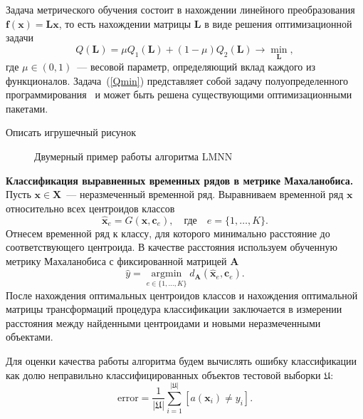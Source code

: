Задача метрического обучения состоит в нахождении линейного преобразования $\mathbf{f}(\mathbf{x}) = \mathbf{Lx}$, то есть нахождении матрицы $\mathbf{L}$ в виде решения оптимизационной задачи
\begin{equation}
\label{Qmin}
Q(\mathbf{L}) = \mu Q_1(\mathbf{L}) + (1 - \mu) Q_2(\mathbf{L}) \rightarrow \min_{\mathbf{L}},
\end{equation}
где $\mu \in (0, 1)$~--- весовой параметр, определяющий вклад каждого из функционалов.
Задача~(\ref{Qmin}) представляет собой задачу полуопределенного программирования~\cite{vandenberghe1996semidefinite} и может быть решена существующими оптимизационными пакетами.

{\color{red} Описать игрушечный рисунок}

\begin{figure}[ht]
	\caption{Двумерный пример работы алгоритма LMNN}
\end{figure}

\textbf{Классификация выравненных временных рядов в метрике Махаланобиса.}
Пусть $\mathbf{x} \in \mathbf{X}$~--- неразмеченный временной ряд. Выравниваем временной ряд $\mathbf{x}$ относительно всех центроидов классов
\[
\mathbf{\hat{x}}_e = G(\mathbf{x}, \mathbf{c}_e), \quad \text{где} \quad e = \{1, \dots, K\}.
\]
Отнесем временной ряд к классу, для которого минимально расстояние до соответствующего центроида. В качестве расстояния используем обученную метрику Махаланобиса с фиксированной матрицей $\mathbf{A}$
\[
\hat{y} = \mathop{\text{argmin}}\limits_{e \in \{1, \dots, K\}}d_\mathbf{A}(\mathbf{\hat{x}}_e, \mathbf{c}_e).
\]
После нахождения оптимальных центроидов классов и нахождения оптимальной матрицы трансформаций процедура классификации заключается в измерении расстояния между найденными центроидами и новыми неразмеченными объектами.

Для оценки качества работы алгоритма будем вычислять ошибку классификации как долю неправильно классифицированных объектов тестовой выборки $\mathfrak{U}$:
\[
\text{error} = \frac1{|\mathfrak{U}|} \sum_{i = 1} ^ {|\mathfrak{U}|} [a(\mathbf{x}_i) \ne y_i].
\]

